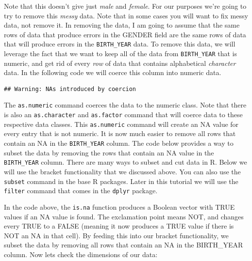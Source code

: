 \documentclass[]{book}
\newenvironment{Shaded}{\begin{snugshade}}{\end{snugshade}}
\newcommand{\KeywordTok}[1]{\textcolor[rgb]{0.13,0.29,0.53}{\textbf{{#1}}}}
\newcommand{\StringTok}[1]{\textcolor[rgb]{0.31,0.60,0.02}{{#1}}}
\newcommand{\NormalTok}[1]{{#1}}
\begin{document}
Note that this doesn't give just \emph{male} and \emph{female}. For our
purposes we're going to try to remove this \emph{messy} data. Note that
in some cases you will want to fix messy data, not remove it. In
removing the data, I am going to assume that the same rows of data that
produce errors in the GENDER field are the same rows of data that will
produce errors in the \texttt{BIRTH\_YEAR} data. To remove this data, we
will leverage the fact that we want to keep all of the data from
\texttt{BIRTH\_YEAR} that is numeric, and get rid of every \emph{row} of
data that contains alphabetical \emph{character} data. In the following
code we will coerce this column into numeric data.

\begin{Shaded}
\end{Shaded}

\begin{verbatim}
## Warning: NAs introduced by coercion
\end{verbatim}

The \texttt{as.numeric} command coerces the data to the numeric class.
Note that there is also an \texttt{as.character} and \texttt{as.factor}
command that will coerce data to these respective data classes. This
\texttt{as.numeric} command will create an NA value for every entry that
is not numeric. It is now much easier to remove all rows that contain an
NA in the \texttt{BIRTH\_YEAR} column. The code below provides a way to
subset the data by removing the rows that contain an NA value in the
\texttt{BIRTH\_YEAR} column. There are many ways to subset and cut data
in R. Below we will use the bracket functionality that we discussed
above. You can also use the \texttt{subset} command in the base R
packages. Later in this tutorial we will use the \texttt{filter} command
that comes in the \texttt{dplyr} package.

\begin{Shaded}
\end{Shaded}

In the code above, the \texttt{is.na} function produces a Boolean vector
with TRUE values if an NA value is found. The exclamation point means
NOT, and changes every TRUE to a FALSE (meaning it now produces a TRUE
value if there is NOT an NA in that cell). By feeding this into our
bracket functionality, we subset the data by removing all rows that
contain an NA in the BIRTH\_YEAR column. Now lets check the dimensions
of our data:
\end{document}
